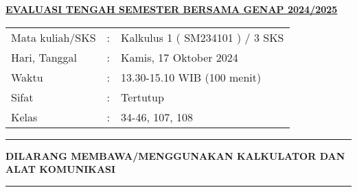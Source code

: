 \documentclass[10pt,openany,a4paper]{article}
\renewcommand{\headrulewidth}{0pt}
\renewcommand{\footrulewidth}{0pt}
\begin{document}
\newpage
\renewcommand{\arraystretch}{1}
\fancyhead{}
\fancyfoot{}
\fancyhead[r]{}
\renewcommand{\headrulewidth}{0pt}
\renewcommand{\footrulewidth}{0pt}
\begin{center}
    {\underline{\textbf{\MakeUppercase{Evaluasi Tengah Semester Bersama Genap 2024/2025}}}}
\end{center}

\begin{center}
    \begin{tabular}{lcl}
        Mata kuliah/SKS & : & Kalkulus 1 ( SM234101 ) / 3 SKS \\
        Hari, Tanggal   & : & Kamis, 17 Oktober 2024          \\
        Waktu           & : & 13.30-15.10 WIB (100 menit)     \\
        Sifat           & : & Tertutup                        \\
        Kelas           & : & 34-46, 107, 108
    \end{tabular}
\end{center}

\noindent\rule{\textwidth}{2.pt}

\setlength{\parindent}{5pt}
\setlength{\parindent}{5pt}
\setlength{\parindent}{5pt}
\par \textbf{\MakeUppercase{dilarang membawa/menggunakan kalkulator dan alat komunikasi}}
\par {}
\noindent\rule{\textwidth}{2.pt}
\end{document}
